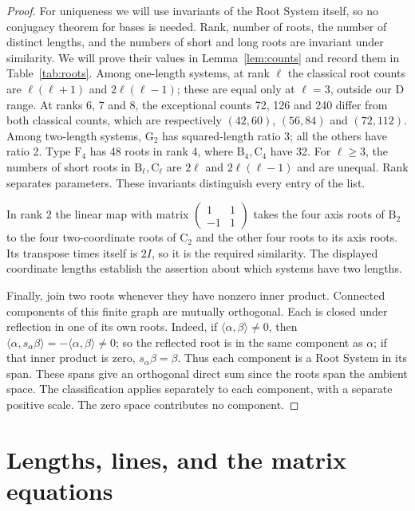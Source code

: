 \documentclass[11pt]{amsart}
\newcommand\pmat[1]{\begin{pmatrix} #1 \end{pmatrix}}
\newcommand\ip[2]{\langle#1,#2\rangle}
\theoremstyle{definition}
\newcommand{\typ}[1]{\mathrm{#1}}
\begin{document}
\begin{proof}
For uniqueness we will use invariants of the Root System itself, so no
conjugacy theorem for bases is needed. Rank, number of roots, the number
of distinct lengths, and the numbers of short and long roots are invariant
under similarity. We will prove their values in
Lemma~\ref{lem:counts} and record them in Table~\ref{tab:roots}.
Among one-length systems, at rank $\ell$ the classical root counts are
$\ell(\ell+1)$ and $2\ell(\ell-1)$; these are equal only at $\ell=3$,
outside our $\typ D$ range. At ranks 6, 7 and 8, the exceptional counts
72, 126 and 240 differ from both classical counts, which are respectively
$(42,60)$, $(56,84)$ and $(72,112)$.
Among two-length systems, $\typ G_2$ has squared-length ratio 3;
all the others have ratio 2. Type $\typ F_4$ has 48 roots in rank 4,
where $\typ B_4,\typ C_4$ have 32. For $\ell\geq3$, the numbers of
short roots in $\typ B_\ell,\typ C_\ell$ are $2\ell$ and
$2\ell(\ell-1)$ and are unequal. Rank separates parameters.
These invariants distinguish every entry of the list.

In rank 2 the linear map with matrix
$\pmat{1&1\\-1&1}$ takes the four axis roots of $\typ B_2$ to
the four two-coordinate roots of $\typ C_2$ and the other four roots
to its axis roots. Its transpose times itself is $2I$, so it is the
required similarity. The displayed coordinate lengths establish the
assertion about which systems have two lengths.

Finally, join two roots whenever they have nonzero inner product.
Connected components of this finite graph are mutually orthogonal.
Each is closed under reflection in one of its own roots. Indeed, if
$\ip{\alpha}{\beta}\ne0$, then
$\ip{\alpha}{s_\alpha\beta}=-\ip{\alpha}{\beta}\ne0$;
so the reflected root is in the same component as $\alpha$;
if that inner product is zero, $s_\alpha\beta=\beta$.
Thus each component is a Root System in its span. These spans give an
orthogonal direct sum since the roots span the ambient space. The
classification applies separately to each component, with a separate
positive scale. The zero space contributes no component.
\end{proof}

\section{Lengths, lines, and the matrix equations}\label{sec:lines}
\end{document}
